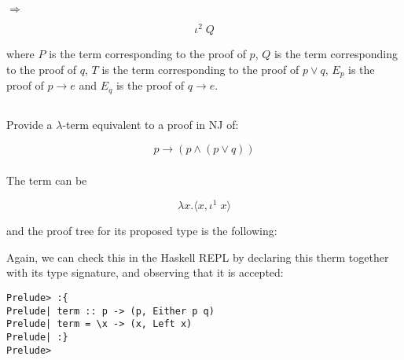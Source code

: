 \documentclass{article}
\begin{document}
\begin{minipage}[c][2cm][c]{.4\textwidth}
\begin{mathpar}
\end{mathpar}
\end{minipage}
$\Longrightarrow$
\begin{minipage}[c]{.4\textwidth}
$$\iota^2\;Q$$
\end{minipage}

where $P$ is the term corresponding to the proof of $p$, 
$Q$ is the term corresponding to the proof of $q$,
$T$ is the term corresponding to the proof of 
$p \lor q$, $E_p$ is the proof of $p \rightarrow e$
and $E_q$ is the proof of $q \rightarrow e$.

\subsection{}\label{ex:5}

Provide a $\lambda$-term equivalent to a proof in NJ of:

$$p \rightarrow (p \land (p \lor q))$$

\subsubsection{}

The term can be

$$
  \lambda x. \langle x, \iota^1\;x \rangle
$$

and the proof tree for its proposed type is the following:

\begin{mathpar}
\end{mathpar}

Again, we can check this in the Haskell REPL by 
declaring this therm together with its type 
signature, and observing that it is accepted:
\begin{verbatim}
Prelude> :{
Prelude| term :: p -> (p, Either p q)
Prelude| term = \x -> (x, Left x)
Prelude| :}
Prelude>
\end{verbatim}
\end{document}
